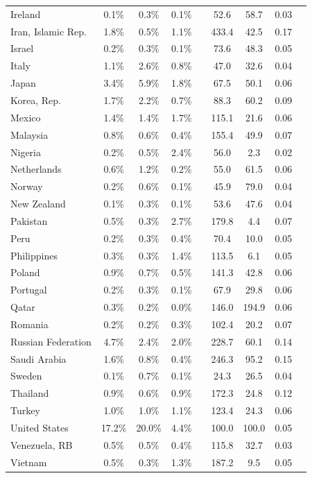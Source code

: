 \begin{center}
\begin{tabular}{l ccc c cc c c}
Ireland & 0.1\% & 0.3\% & 0.1\% && 52.6 & 58.7 & 0.03 \\
Iran, Islamic Rep. & 1.8\% & 0.5\% & 1.1\% && 433.4 & 42.5 & 0.17 \\
Israel & 0.2\% & 0.3\% & 0.1\% && 73.6 & 48.3 & 0.05 \\
Italy & 1.1\% & 2.6\% & 0.8\% && 47.0 & 32.6 & 0.04 \\
Japan & 3.4\% & 5.9\% & 1.8\% && 67.5 & 50.1 & 0.06 \\
Korea, Rep. & 1.7\% & 2.2\% & 0.7\% && 88.3 & 60.2 & 0.09 \\
Mexico & 1.4\% & 1.4\% & 1.7\% && 115.1 & 21.6 & 0.06 \\
Malaysia & 0.8\% & 0.6\% & 0.4\% && 155.4 & 49.9 & 0.07 \\
Nigeria & 0.2\% & 0.5\% & 2.4\% && 56.0 & 2.3 & 0.02 \\
Netherlands & 0.6\% & 1.2\% & 0.2\% && 55.0 & 61.5 & 0.06 \\
Norway & 0.2\% & 0.6\% & 0.1\% && 45.9 & 79.0 & 0.04 \\
New Zealand & 0.1\% & 0.3\% & 0.1\% && 53.6 & 47.6 & 0.04 \\
Pakistan & 0.5\% & 0.3\% & 2.7\% && 179.8 & 4.4 & 0.07 \\
Peru & 0.2\% & 0.3\% & 0.4\% && 70.4 & 10.0 & 0.05 \\
Philippines & 0.3\% & 0.3\% & 1.4\% && 113.5 & 6.1 & 0.05 \\
Poland & 0.9\% & 0.7\% & 0.5\% && 141.3 & 42.8 & 0.06 \\
Portugal & 0.2\% & 0.3\% & 0.1\% && 67.9 & 29.8 & 0.06 \\
Qatar & 0.3\% & 0.2\% & 0.0\% && 146.0 & 194.9 & 0.06 \\
Romania & 0.2\% & 0.2\% & 0.3\% && 102.4 & 20.2 & 0.07 \\
Russian Federation & 4.7\% & 2.4\% & 2.0\% && 228.7 & 60.1 & 0.14 \\
Saudi Arabia & 1.6\% & 0.8\% & 0.4\% && 246.3 & 95.2 & 0.15 \\
Sweden & 0.1\% & 0.7\% & 0.1\% && 24.3 & 26.5 & 0.04 \\
Thailand & 0.9\% & 0.6\% & 0.9\% && 172.3 & 24.8 & 0.12 \\
Turkey & 1.0\% & 1.0\% & 1.1\% && 123.4 & 24.3 & 0.06 \\
United States & 17.2\% & 20.0\% & 4.4\% && 100.0 & 100.0 & 0.05 \\
Venezuela, RB & 0.5\% & 0.5\% & 0.4\% && 115.8 & 32.7 & 0.03 \\
Vietnam & 0.5\% & 0.3\% & 1.3\% && 187.2 & 9.5 & 0.05 \\

\end{tabular}
\end{center}
